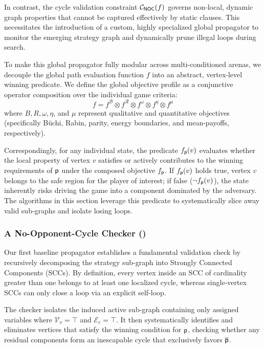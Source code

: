 \documentclass[a4paper,fleqn]{cas-sc}
\begin{document}
In contrast, the cycle validation constraint $\mathcal{C}_{{\textsf{NOC}}}(f)$ governs non-local, dynamic graph properties that cannot be captured effectively by static clauses. This necessitates the introduction of a custom, highly specialized global propagator to monitor the emerging strategy graph and dynamically prune illegal loops during search.

To make this global propagator fully modular across multi-conditioned arenas, we decouple the global path evaluation function $f$ into an abstract, vertex-level winning predicate. We define the global objective profile as a conjunctive operator composition over the individual game criteria:
\[
f = f^\mathcal{B} \otimes f^\mathcal{R} \otimes f^\omega \otimes f^\eta \otimes f^\mu 
\]
where $B, R, \omega, \eta$, and $\mu$ represent qualitative and quantitative objectives (specifically Büchi, Rabin, parity, energy boundaries, and mean-payoffs, respectively). 

Correspondingly, for any individual state, the predicate $f_{\mathsf{p}}(v)$ evaluates whether the local property of vertex $v$ satisfies or actively contributes to the winning requirements of $\mathsf{p}$ under the composed objective $f_{\mathsf{p}}$. If $f_{\mathsf{p}}(v)$ holds true, vertex $v$ belongs to the safe region for the player of interest; if false ($\neg f_{\mathsf{p}}(v)$), the state inherently risks driving the game into a component dominated by the adversary. The algorithms in this section leverage this predicate to systematically slice away valid sub-graphs and isolate losing loops.

\subsubsection{A No-Opponent-Cycle Checker  (\nocchecker)} \label{sec:nocchecker}

Our first baseline propagator establishes a fundamental validation check by recursively decomposing the strategy sub-graph into Strongly Connected Components (SCCs). By definition, every vertex inside an SCC of cardinality greater than one belongs to at least one localized cycle, whereas single-vertex SCCs can only close a loop via an explicit self-loop. 

The checker isolates the induced active sub-graph containing only assigned variables where $\mathcal{V}_v = \top$ and $\mathcal{E}_e = \top$. It then systematically identifies and eliminates vertices that satisfy the winning condition for $\mathsf{p}$, checking whether any residual components form an inescapable cycle that exclusively favors $\overline{\mathsf{p}}$.
\end{document}
